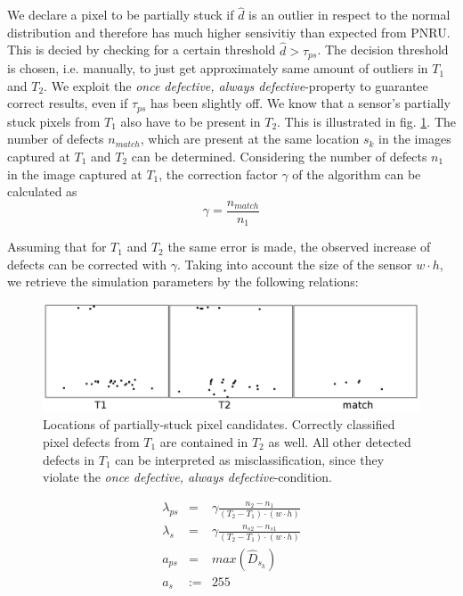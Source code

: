 \documentclass[10pt,twocolumn,letterpaper]{article}
\begin{document}
We declare a pixel to be partially stuck if $\hat{d}$ is an outlier in respect to the normal distribution and therefore has much higher sensivitiy than expected from PNRU. This is decied by checking for a certain threshold $\hat{d} > \tau_{ps}$. The decision threshold is chosen, i.e. manually, to just get approximately same amount of outliers in $T_1$ and $T_2$. We exploit the \emph{once defective, always defective}-property to guarantee correct results, even if $\tau_{ps}$ has been slightly off. We know that a sensor's partially stuck pixels from $T_1$ also have to be present in $T_2$. This is illustrated in fig. \ref{fig:defectPersistence}. The number of defects $n_{match}$, which are present at the same location $s_k$ in the images captured at $T_1$ and $T_2$ can be determined. Considering the number of defects $n_1$ in the image captured at $T_1$, the correction factor $\gamma$ of the algorithm can be calculated as
\begin{equation}
\gamma = \frac{n_{match}}{n_1}
\end{equation}

Assuming that for $T_1$ and $T_2$ the same error is made, the observed increase of defects can be corrected with $\gamma$. Taking into account the size of the sensor $w\cdot h$, we retrieve the simulation parameters by the following relations: 

\begin{figure}
  \centering
  \includegraphics[width=\linewidth]{img/detectedLocations.png}
  \caption{Locations of partially-stuck pixel candidates. Correctly classified pixel defects from $T_1$ are contained in $T_2$ as well. All other detected defects in $T_1$ can be interpreted as misclassification, since they violate the \emph{once defective, always defective}-condition.}
  \label{fig:defectPersistence}
\end{figure}


\begin{eqnarray}
 \lambda_{ps} 	& = 	& \gamma \frac{n_2-n_1}{(T_2-T_1)\cdot(w \cdot h)} \\ 
 \lambda_{s} 	& = 	& \gamma  \frac{n_{s2}-n_{s1}}{(T_2-T_1)\cdot(w \cdot h)} \\
 a_{ps} 	& = 	&max(\hat{D}_{s_k}) \\ 
 a_{s} 		&:= 	& 255
\end{eqnarray}
\end{document}
